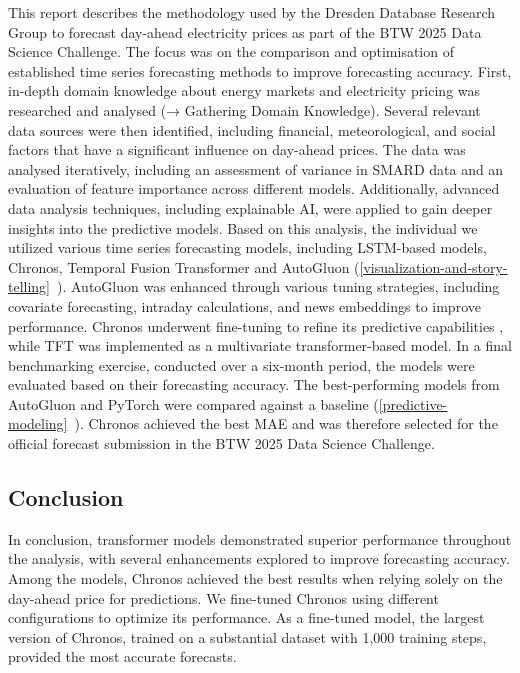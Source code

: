 \documentclass[a4paper]{article}
\begin{document}
This report describes the methodology used by the Dresden Database
Research Group to forecast day-ahead electricity prices as part of the
BTW 2025 Data Science Challenge. The focus was on the comparison and
optimisation of established time series forecasting methods to improve
forecasting accuracy. First, in-depth domain knowledge about energy
markets and electricity pricing was researched and analysed (→ Gathering
Domain Knowledge). Several relevant data sources were then identified,
including financial, meteorological, and social factors that have a
significant influence on day-ahead prices. The data was analysed
iteratively, including an assessment of variance in SMARD data and an
evaluation of feature importance across different models. Additionally,
advanced data analysis techniques, including explainable AI, were
applied to gain deeper insights into the predictive models. Based on
this analysis, the individual we utilized various time series
forecasting models, including LSTM-based models, Chronos, Temporal
Fusion Transformer and AutoGluon (\ref{visualization-and-story-telling}~).
AutoGluon was enhanced through various tuning strategies, including
covariate forecasting, intraday calculations, and news embeddings to
improve performance. Chronos underwent fine-tuning to refine its
predictive capabilities , while TFT was implemented as a multivariate
transformer-based model. In a final benchmarking exercise, conducted
over a six-month period, the models were evaluated based on their
forecasting accuracy. The best-performing models from AutoGluon and
PyTorch were compared against a baseline (\ref{predictive-modeling}~).
Chronos achieved the best MAE and was therefore selected for the
official forecast submission in the BTW 2025 Data Science Challenge.

    \subsection{Conclusion}\label{conclusion}

In conclusion, transformer models demonstrated superior performance
throughout the analysis, with several enhancements explored to improve
forecasting accuracy. Among the models, Chronos achieved the best
results when relying solely on the day-ahead price for predictions. We
fine-tuned Chronos using different configurations to optimize its
performance. As a fine-tuned model, the largest version of Chronos,
trained on a substantial dataset with 1,000 training steps, provided the
most accurate forecasts.
\end{document}
